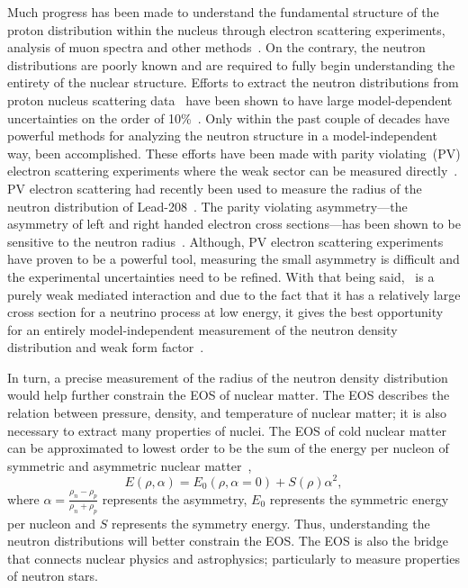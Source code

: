 Much progress has been made to understand the fundamental structure of the proton distribution within the nucleus through electron scattering experiments, analysis of muon spectra and other methods~\cite{angeli:2013:table}. On the contrary, the neutron distributions are poorly known and are required to fully begin understanding the entirety of the nuclear structure. Efforts to extract the neutron distributions from proton nucleus scattering data~\cite{ray:1978:uncertainties, starodubsky:1994:extraction, clark:2003:neutron, zenihiro:2018:direct} have been shown to have large model-dependent uncertainties on the order of 10\%~\cite{patton:2012:neutrino}. Only within the past couple of decades have powerful methods for analyzing the neutron structure in a model-independent way, been accomplished. These efforts have been made with parity violating~(PV) electron scattering experiments where the weak sector can be measured directly~\cite{beck:2001:parity}. PV electron scattering had recently been used to measure the radius of the neutron distribution of Lead-208~\cite{PREX:2012:measurementPb, horowitz:2012:weak}. The parity violating asymmetry---the asymmetry of left and right handed electron cross sections---has been shown to be sensitive to the neutron radius~\cite{roca:2011:neutron}. Although, PV electron scattering experiments have proven to be a powerful tool, measuring the small asymmetry is difficult and the experimental uncertainties need to be refined. With that being said, \cevns\ is a purely weak mediated interaction and due to the fact that it has a relatively large cross section for a neutrino process at low energy, it gives the best opportunity for an entirely model-independent measurement of the neutron density distribution and weak form factor~\cite{patton:2012:neutrino, patton:2013:prospects}. 

In turn, a precise measurement of the radius of the neutron density distribution would help further constrain the EOS of nuclear matter. The EOS describes the relation between pressure, density, and temperature of nuclear matter; it is also necessary to extract many properties of nuclei. The EOS of cold nuclear matter can be approximated to lowest order to be the sum of the energy per nucleon of symmetric and asymmetric nuclear matter~\cite{piekarewicz:2009:incompressibility},
\begin{equation}
E(\rho,\alpha)=E_0(\rho,\alpha=0)+S(\rho)\alpha ^2,
\end{equation}
where $\alpha = \frac{\rho _n - \rho _p}{\rho _n +\rho _p}$ represents the asymmetry, $E_0$ represents the symmetric energy per nucleon and $S$ represents the symmetry energy. Thus, understanding the neutron distributions will better constrain the EOS. The EOS is also the bridge that connects nuclear physics and astrophysics; particularly to measure properties of neutron stars. 

